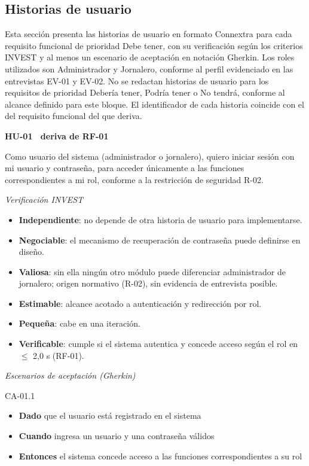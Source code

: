 \documentclass[12pt,a4paper]{article}
\begin{document}
\subsection{Historias de usuario}
\label{sec:historias-usuario}

Esta sección presenta las historias de usuario en formato Connextra para cada requisito funcional de prioridad Debe tener, con su verificación según los criterios INVEST y al menos un escenario de aceptación en notación Gherkin. Los roles utilizados son Administrador y Jornalero, conforme al perfil evidenciado en las entrevistas EV-01 y EV-02. No se redactan historias de usuario para los requisitos de prioridad Debería tener, Podría tener o No tendrá, conforme al alcance definido para este bloque. El identificador de cada historia coincide con el del requisito funcional del que deriva.

\bigskip
\noindent\textbf{HU-01 \textperiodcentered\ deriva de RF-01}

\smallskip
\noindent Como usuario del sistema (administrador o jornalero), quiero iniciar sesión con mi usuario y contraseña, para acceder únicamente a las funciones correspondientes a mi rol, conforme a la restricción de seguridad R-02.

\smallskip
\noindent\textit{Verificación INVEST}
\begin{itemize}
\item \textbf{Independiente}: no depende de otra historia de usuario para implementarse.
\item \textbf{Negociable}: el mecanismo de recuperación de contraseña puede definirse en diseño.
\item \textbf{Valiosa}: sin ella ningún otro módulo puede diferenciar administrador de jornalero; origen normativo (R-02), sin evidencia de entrevista posible.
\item \textbf{Estimable}: alcance acotado a autenticación y redirección por rol.
\item \textbf{Pequeña}: cabe en una iteración.
\item \textbf{Verificable}: cumple si el sistema autentica y concede acceso según el rol en $\leq$ 2,0 s (RF-01).
\end{itemize}

\smallskip
\noindent\textit{Escenarios de aceptación (Gherkin)}

\noindent CA-01.1
\begin{itemize}
\item[] \textbf{Dado} que el usuario está registrado en el sistema
\item[] \textbf{Cuando} ingresa un usuario y una contraseña válidos
\item[] \textbf{Entonces} el sistema concede acceso a las funciones correspondientes a su rol
\end{itemize}
\end{document}
